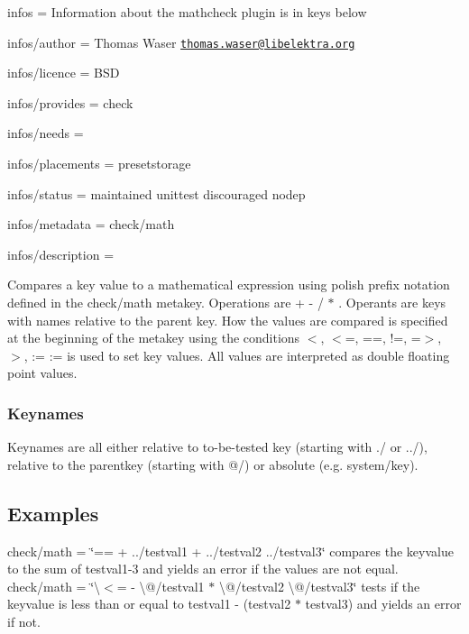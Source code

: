 
\begin{DoxyItemize}
\item infos = Information about the mathcheck plugin is in keys below
\item infos/author = Thomas Waser \href{mailto:thomas.waser@libelektra.org}{\tt thomas.\+waser@libelektra.\+org}
\item infos/licence = B\+S\+D
\item infos/provides = check
\item infos/needs =
\item infos/placements = presetstorage
\item infos/status = maintained unittest discouraged nodep
\item infos/metadata = check/math
\item infos/description =
\end{DoxyItemize}

Compares a key value to a mathematical expression using polish prefix notation defined in the {\ttfamily check/math} metakey. Operations are {\ttfamily + -\/ / $\ast$} . Operants are keys with names relative to the parent key. How the values are compared is specified at the beginning of the metakey using the conditions {\ttfamily $<$, $<$=, ==, !=, =$>$, $>$, \+:=} {\ttfamily \+:=} is used to set key values. All values are interpreted as {\ttfamily double} floating point values.

\subsubsection*{Keynames}

Keynames are all either relative to to-\/be-\/tested key (starting with {\ttfamily ./} or {\ttfamily ../}), relative to the parentkey (starting with {\ttfamily @/}) or absolute (e.\+g. {\ttfamily system/key}).

\subsection*{Examples}

{\ttfamily check/math = \char`\"{}== + ../testval1 + ../testval2 ../testval3\char`\"{}} compares the keyvalue to the sum of testval1-\/3 and yields an error if the values are not equal. {\ttfamily check/math = \char`\"{}\textbackslash{}$<$= -\/ \textbackslash{}@/testval1 $\ast$ \textbackslash{}@/testval2 \textbackslash{}@/testval3\char`\"{}} tests if the keyvalue is less than or equal to testval1 -\/ (testval2 $\ast$ testval3) and yields an error if not.

